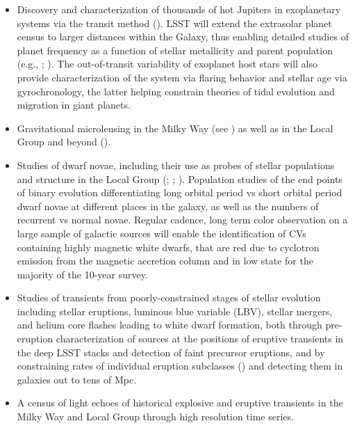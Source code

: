 \begin{itemize}


\item Discovery and characterization of thousands of hot Jupiters
  in exoplanetary systems via the transit method (\cite{2012ApJ...753..160W}).
LSST will extend the extrasolar planet census to larger distances within the Galaxy, thus enabling detailed studies
of planet frequency as a function of stellar metallicity and parent population (e.g., \cite{2009ApJ...695..336H}; \cite{2011ApJ...743..103B}).
The out-of-transit variability of exoplanet host stars will also provide characterization of the system
via flaring behavior and stellar age via gyrochronology, the latter helping constrain theories of tidal evolution and
migration in giant planets.

\item Gravitational microlensing in the Milky Way (see \cite{2008ApJ...681..806H}) as well as in the Local Group and beyond (\cite{2008A&A...478..755D}).

\item Studies of dwarf novae, including their use as probes of stellar populations and
      structure in the Local Group (\cite{2005AJ....129.1873N}; \cite{2006AJ....131.2980S}; \cite{2009ApJ...692..324S}). Population studies of the end points of binary evolution differentiating long orbital period vs short orbital period dwarf novae at different places in the galaxy, as well as the numbers of recurrent vs normal novae. Regular cadence, long term color observation on a large sample of galactic sources will enable the identification of CVs containing highly magnetic white dwarfs, that are red due to cyclotron emission from the magnetic accretion column and in low state for the majority of the 10-year survey.

\item Studies of  transients from poorly-constrained stages of stellar evolution including
stellar eruptions,  luminous blue variable (LBV), stellar mergers, and helium core flashes leading to white dwarf formation,  both through pre-eruption characterization of sources at the positions of eruptive transients in the deep LSST stacks and detection of faint precursor eruptions, and by constraining rates of individual eruption subclasses (\cite{2014ARA&A..52..487S}) and detecting them in galaxies out to tens of Mpc.

\item A census of light echoes of historical explosive and eruptive
  transients in the Milky Way and Local Group through high resolution
  time series.


\end{itemize}

